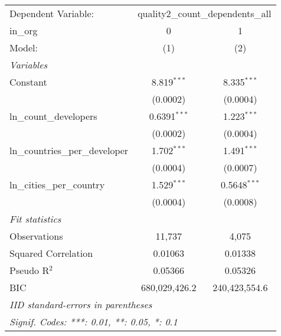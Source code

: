 
\begingroup
\centering
\begin{tabular}{lcc}
   \tabularnewline \midrule \midrule
   Dependent Variable: & \multicolumn{2}{c}{quality2\_count\_dependents\_all}\\
   in\_org                          & 0              & 1 \\   
   Model:                           & (1)            & (2)\\  
   \midrule
   \emph{Variables}\\
   Constant                         & 8.819$^{***}$  & 8.335$^{***}$\\   
                                    & (0.0002)       & (0.0004)\\   
   ln\_count\_developers            & 0.6391$^{***}$ & 1.223$^{***}$\\   
                                    & (0.0002)       & (0.0004)\\   
   ln\_countries\_per\_developer    & 1.702$^{***}$  & 1.491$^{***}$\\   
                                    & (0.0004)       & (0.0007)\\   
   ln\_cities\_per\_country         & 1.529$^{***}$  & 0.5648$^{***}$\\   
                                    & (0.0004)       & (0.0008)\\   
   \midrule
   \emph{Fit statistics}\\
   Observations                     & 11,737         & 4,075\\  
   Squared Correlation              & 0.01063        & 0.01338\\  
   Pseudo R$^2$                     & 0.05366        & 0.05326\\  
   BIC                              & 680,029,426.2  & 240,423,554.6\\  
   \midrule \midrule
   \multicolumn{3}{l}{\emph{IID standard-errors in parentheses}}\\
   \multicolumn{3}{l}{\emph{Signif. Codes: ***: 0.01, **: 0.05, *: 0.1}}\\
\end{tabular}
\par\endgroup



